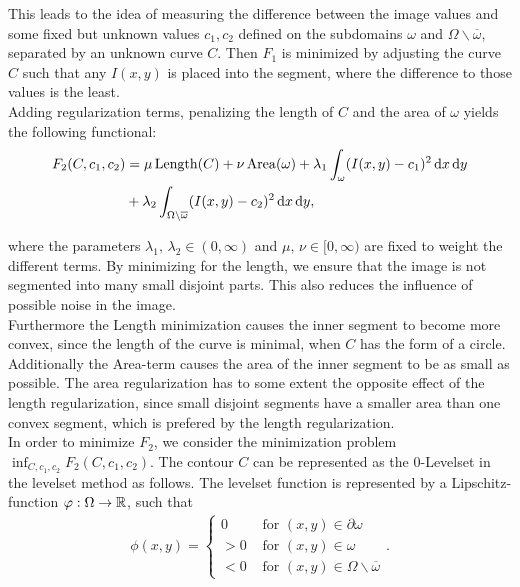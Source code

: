 This leads to the idea of measuring the difference between the image values and some fixed but unknown values $c_1,c_2$ defined on the subdomains $\omega$ and $\Omega\backslash \overline{\omega}$, separated by an unknown curve $C$. Then $F_1$ is minimized by adjusting the curve $C$ such that any $I(x,y)$ is placed into the segment, where the difference to those values is the least.\\

Adding regularization terms, penalizing the length of $C$ and the area of $\omega$ yields the following functional:
\begin{equation}
  \begin{split}
    F_2(C,c_1,c_2) &= \mu\,{\rm Length}(C) + \nu\,{\rm Area}(\omega) + \lambda_1\int_{\omega}(I(x,y)-c_1)^2 \df x \df y\\
    &+ \lambda_2\int_{\Omega\backslash\overline{\omega}} (I(x,y)-c_2)^2 \df x \df y,
  \end{split}\label{F1}
\end{equation}

where the parameters $\lambda_1,\,\lambda_2\in (0,\infty)$ and $\mu,\,\nu\in [0,\infty)$ are fixed to weight the different terms. By minimizing for the length, we ensure that the image is not segmented into many small disjoint parts. This also reduces the influence of possible noise in the image.\\
Furthermore the Length minimization causes the inner segment to become more convex, since the length of the curve is minimal, when $C$ has the form of a circle.\\
Additionally the Area-term causes the area of the inner segment to be as small as possible. The area regularization has to some extent the opposite effect of the length regularization, since small disjoint segments have a smaller area than one convex segment, which is prefered by the length regularization.\\

In order to minimize $F_2$, we consider the minimization problem $\inf_{C,c_1,c_2}F_2(C,c_1,c_2)$. The contour $C$ can be represented as the $0$-Levelset in the levelset method as follows. The levelset function is represented by a Lipschitz-function $\varphi:\Omega\to\mathbb R$, such that
\begin{align*}
  \phi(x,y) = 
  \begin{cases}
    0 & \mbox{ for } (x,y) \in \partial\omega\\
    > 0 & \mbox{ for } (x,y) \in \omega\\
    < 0 & \mbox{ for } (x,y) \in \Omega\backslash\overline{\omega}
  \end{cases}.
\end{align*}

